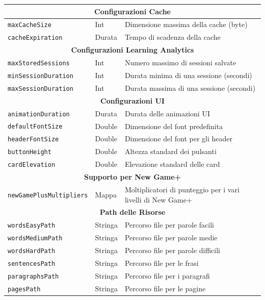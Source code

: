 \documentclass[14pt]{extbook}
\begin{document}
\begin{longtable}{| m{6cm} | m{3cm} | m{6cm} |}
    \multicolumn{3}{|c|}{\textbf{Configurazioni Cache}} \\ \hline
    \texttt{maxCacheSize} & Int & Dimensione massima della cache (byte) \\ \hline
    \texttt{cacheExpiration} & Durata & Tempo di scadenza della cache \\ \hline

    \multicolumn{3}{|c|}{\textbf{Configurazioni Learning Analytics}} \\ \hline
    \texttt{maxStoredSessions} & Int & Numero massimo di sessioni salvate \\ \hline
    \texttt{minSessionDuration} & Int & Durata minima di una sessione (secondi) \\ \hline
    \texttt{maxSessionDuration} & Int & Durata massima di una sessione (secondi) \\ \hline

    \multicolumn{3}{|c|}{\textbf{Configurazioni UI}} \\ \hline
    \texttt{animationDuration} & Durata & Durata delle animazioni UI \\ \hline
    \texttt{defaultFontSize} & Double & Dimensione del font predefinita \\ \hline
    \texttt{headerFontSize} & Double & Dimensione del font per gli header \\ \hline
    \texttt{buttonHeight} & Double & Altezza standard dei pulsanti \\ \hline
    \texttt{cardElevation} & Double & Elevazione standard delle card \\ \hline

    \multicolumn{3}{|c|}{\textbf{Supporto per New Game+}} \\ \hline
    \texttt{newGamePlusMultipliers} & Mappa & Moltiplicatori di punteggio per i vari livelli di New Game+ \\ \hline

    \multicolumn{3}{|c|}{\textbf{Path delle Risorse}} \\ \hline
    \texttt{wordsEasyPath} & Stringa & Percorso file per parole facili \\ \hline
    \texttt{wordsMediumPath} & Stringa & Percorso file per parole medie \\ \hline
    \texttt{wordsHardPath} & Stringa & Percorso file per parole difficili \\ \hline
    \texttt{sentencesPath} & Stringa & Percorso file per le frasi \\ \hline
    \texttt{paragraphsPath} & Stringa & Percorso file per i paragrafi \\ \hline
    \texttt{pagesPath} & Stringa & Percorso file per le pagine \\ \hline

\end{longtable}
\end{document}
